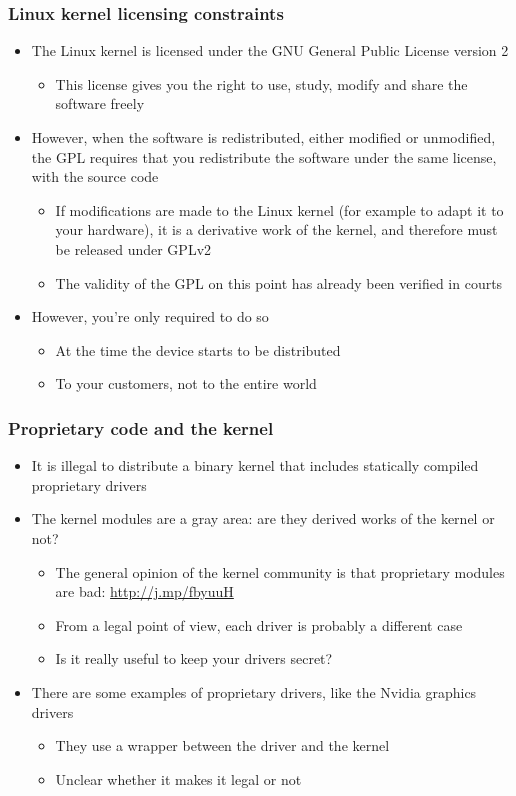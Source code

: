 \begin{frame}
  \frametitle{Linux kernel licensing constraints}
  \begin{itemize}
  \item The Linux kernel is licensed under the GNU General Public
    License version 2
    \begin{itemize}
    \item This license gives you the right to use, study, modify and
      share the software freely
    \end{itemize}
  \item However, when the software is redistributed, either modified
    or unmodified, the GPL requires that you redistribute the software
    under the same license, with the source code
    \begin{itemize}
    \item If modifications are made to the Linux kernel (for example
      to adapt it to your hardware), it is a derivative work of the
      kernel, and therefore must be released under GPLv2
    \item The validity of the GPL on this point has already been
      verified in courts
    \end{itemize}
  \item However, you're only required to do so
    \begin{itemize}
    \item At the time the device starts to be distributed
    \item To your customers, not to the entire world
    \end{itemize}
  \end{itemize}
\end{frame}

\begin{frame}
  \frametitle{Proprietary code and the kernel}
  \begin{itemize}
  \item It is illegal to distribute a binary kernel that includes
    statically compiled proprietary drivers
  \item The kernel modules are a gray area: are they derived works of
    the kernel or not?
    \begin{itemize}
    \item The general opinion of the kernel community is that
      proprietary modules are bad: \url{http://j.mp/fbyuuH}
    \item From a legal point of view, each driver is probably a
      different case
    \item Is it really useful to keep your drivers secret?
    \end{itemize}
  \item There are some examples of proprietary drivers, like the
    Nvidia graphics drivers
    \begin{itemize}
    \item They use a wrapper between the driver and the kernel
    \item Unclear whether it makes it legal or not
    \end{itemize}
  \end{itemize}
\end{frame}

